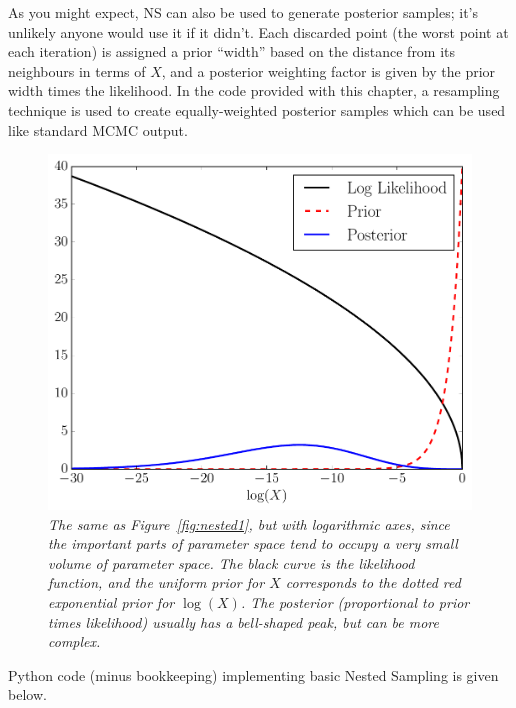 As you might expect, NS can also be used to generate posterior samples; it's
unlikely anyone would use it if it didn't.
Each discarded point (the worst point at each iteration) is assigned a
prior ``width'' based on the distance from its neighbours in terms of $X$,
and a posterior weighting factor is given by the prior width times the
likelihood. In the code provided with this chapter, a resampling technique
is used to create equally-weighted posterior samples which can be used
like standard MCMC output.

\begin{figure}
\begin{center}
\includegraphics[scale=0.45]{nested2.pdf}
\caption{\it The same as Figure~\ref{fig:nested1}, but with logarithmic
axes, since the important parts of parameter space tend to occupy a very
small volume of parameter space. The black curve is the likelihood function,
and the uniform prior for $X$ corresponds to the dotted red exponential prior
for $\log(X)$. The posterior (proportional to prior times likelihood) usually
has a bell-shaped peak, but can be more complex.\label{fig:nested2}}
\end{center}
\end{figure}

Python code (minus bookkeeping) implementing basic Nested Sampling is given
below.

